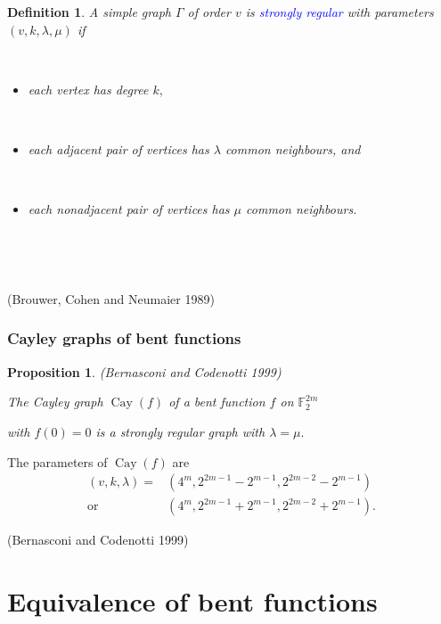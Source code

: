 \documentclass[pdf,sprung,slideColor,nocolorBG]{beamer}
\newenvironment{colortheme}[1]{
\def\ProvidesPackageRCS $##1${\relax}
\renewcommand{\ProcessOptions}{\relax}
\makeatletter

\makeatother
}{}
\newcommand{\slidecite}[1]{\tiny{(#1)}\normalsize{}}
\newcommand{\smallcite}[1]{\small{(#1)}\normalsize{}}
\newcommand{\mb}[1]{\mathbb{#1}}
\newcommand{\Emph}[1]{\emph{\textcolor{blue}{#1}}}
\newcommand{\Cay}[1]{\operatorname{Cay}\left(#1\right)}
\newcommand{\F}{\mb{F}}
\newtheorem{Def}{Definition}
\newtheorem{Proposition}{Proposition}
\begin{document}
\begin{colortheme}{seagull}
\begin{frame}
\begin{Def}
A simple graph $\Gamma$ of order $v$ is \Emph{strongly regular} with parameters
$(v,k,\lambda,\mu)$ if

~

\begin{itemize}
 \item
each vertex has degree $k,$

~
 \item
each adjacent pair of vertices has $\lambda$ common neighbours, and

~
\item
each nonadjacent pair of vertices has $\mu$ common neighbours.
\end{itemize}
 
\end{Def}

~

~

\slidecite{Brouwer, Cohen and Neumaier 1989}

\end{frame}

\begin{frame}
\frametitle{Cayley graphs of bent functions}

\begin{Proposition}
\smallcite{Bernasconi and Codenotti 1999}

The Cayley graph $\Cay{f}$ of a bent function $f$ on $\F_2^{2m}$

with $f(0)=0$ is a strongly regular graph with $\lambda = \mu.$
\end{Proposition}

The parameters of $\Cay{f}$ are
\begin{align*}
(v,k,\lambda) = &(4^m, 2^{2 m - 1} - 2^{m-1}, 2^{2 m - 2} - 2^{m-1})
\\
  \text{or} \quad &(4^m, 2^{2 m - 1} + 2^{m-1}, 2^{2 m - 2} + 2^{m-1}).
\end{align*}

\slidecite{Bernasconi and Codenotti 1999}
\end{frame}

\end{colortheme}

\section{Equivalence of bent functions}
\end{document}
